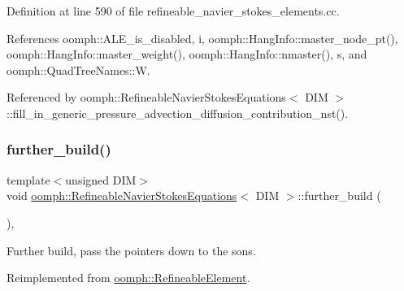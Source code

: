 Definition at line 590 of file refineable\+\_\+navier\+\_\+stokes\+\_\+elements.\+cc.



References oomph\+::\+A\+L\+E\+\_\+is\+\_\+disabled, i, oomph\+::\+Hang\+Info\+::master\+\_\+node\+\_\+pt(), oomph\+::\+Hang\+Info\+::master\+\_\+weight(), oomph\+::\+Hang\+Info\+::nmaster(), s, and oomph\+::\+Quad\+Tree\+Names\+::W.



Referenced by oomph\+::\+Refineable\+Navier\+Stokes\+Equations$<$ D\+I\+M $>$\+::fill\+\_\+in\+\_\+generic\+\_\+pressure\+\_\+advection\+\_\+diffusion\+\_\+contribution\+\_\+nst().

\mbox{\label{classoomph_1_1RefineableNavierStokesEquations_a7afd6250585ea597c3df65b8c7744da4}} 
\subsubsection{\texorpdfstring{further\+\_\+build()}{further\_build()}}
{\footnotesize\ttfamily template$<$unsigned D\+IM$>$ \\
void \hyperlink{classoomph_1_1RefineableNavierStokesEquations}{oomph\+::\+Refineable\+Navier\+Stokes\+Equations}$<$ D\+IM $>$\+::further\+\_\+build (\begin{DoxyParamCaption}{ }\end{DoxyParamCaption})\hspace{0.3cm}{\ttfamily [inline]}, {\ttfamily [virtual]}}



Further build, pass the pointers down to the sons. 



Reimplemented from \hyperlink{classoomph_1_1RefineableElement_a26628ce36dfad028686adeb4694a9ef3}{oomph\+::\+Refineable\+Element}.



